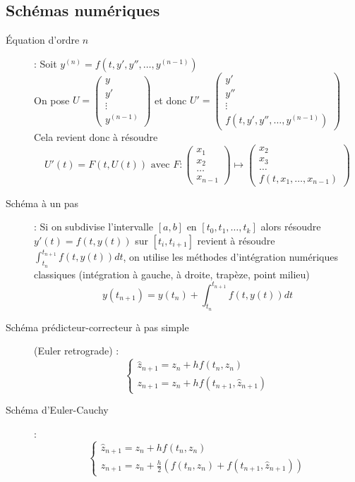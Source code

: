 \subsection{Schémas numériques}
\begin{description}
\item[Équation d'ordre $n$] : Soit $y^{(n)}=f(t,y',y'',\dots,y^{(n-1)})$\\
    On pose $U=\begin{pmatrix}y\\ y'\\ \vdots\\ y^{(n-1)}\end{pmatrix}$ et donc $U'=\begin{pmatrix}
        y'\\
        y''\\
        \vdots\\
        f(t,y',y'',\dots,y^{(n-1)})
    \end{pmatrix}$
    Cela revient donc à résoudre
    \[
        U'(t)=F(t,U(t))\textrm{ avec }
        F:
        \begin{pmatrix}
            x_1\\ x_2 \\ \hdots \\ x_{n-1}
        \end{pmatrix}
        \mapsto
        \begin{pmatrix}
            x_2 \\ x_3 \\ \hdots \\ f(t, x_1,\dots, x_{n-1})
        \end{pmatrix}
    \]
\item[Schéma à un pas] : Si on subdivise l'intervalle $[a,b]$ en $[t_0,t_1,\dots,t_k]$ alors résoudre $y'(t)=f(t,y(t))$ sur $[t_i,t_{i+1}]$ revient à résoudre
    $\int_{t_n}^{t_{n+1}}f(t,y(t))dt$, on utilise les méthodes d'intégration numériques classiques (intégration à gauche, à droite, trapèze, point milieu)
    \[
        y(t_{n+1})=y(t_n)+\int_{t_n}^{t_{n+1}} f(t,y(t))dt
    \]
\item[Schéma prédicteur-correcteur à pas simple] (Euler retrograde) :
    \[
        \begin{cases}
            \hat z_{n+1} = z_n + hf(t_n,z_n)\\
            z_{n+1}= z_n + hf(t_{n+1},\hat z_{n+1})
        \end{cases}
    \]
\item[Schéma d'Euler-Cauchy] : 
    \[
        \begin{cases}
            \hat z_{n+1}=z_n+hf(t_n,z_n)\\
            z_{n+1}=z_n+\frac{h}{2}( f(t_n,z_n) + f(t_{n+1}, \hat z_{n+1}) )
        \end{cases}
    \]
\end{description}
